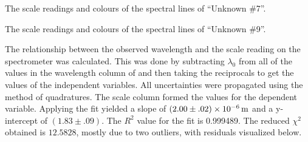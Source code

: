 \begin{paper}
{The scale readings and colours of the spectral lines of ``Unknown \#7''.}

{The scale readings and colours of the spectral lines of ``Unknown \#9''.}


The relationship between the observed wavelength and the
scale reading on the spectrometer was calculated.
This was done by subtracting $\lambda_0$ from all of the values in the wavelength column of
\figHelium and then taking the reciprocals to get the values of the independent
variables.
All uncertainties were propagated using the method of quadratures.
The scale column formed the values for the dependent variable.
Applying the fit yielded a slope of $(2.00\pm.02)\times\SI{E-6}{\meter}$ and a
y-intercept of $(1.83\pm.09)$.
The $R^2$ value for the fit is 0.999489.
The reduced $ \chi^2 $ obtained is $12.5828$, mostly due to two outliers, with residuals visualized below.


\end{paper}
